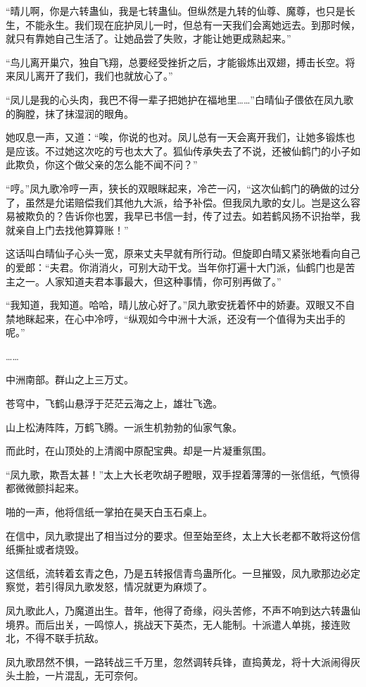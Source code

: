 \begin{this_body}
“晴儿啊，你是六转蛊仙，我是七转蛊仙。但纵然是九转的仙尊、魔尊，也只是长生，不能永生。我们现在庇护凤儿一时，但总有一天我们会离她远去。到那时候，就只有靠她自己生活了。让她品尝了失败，才能让她更成熟起来。”

“鸟儿离开巢穴，独自飞翔，总要经受挫折之后，才能锻炼出双翅，搏击长空。将来凤儿离开了我们，我们也就放心了。”

“凤儿是我的心头肉，我巴不得一辈子把她护在福地里……”白晴仙子偎依在凤九歌的胸膛，抹了抹湿润的眼角。

她叹息一声，又道：“唉，你说的也对。凤儿总有一天会离开我们，让她多锻炼也是应该。不过她这次吃的亏也太大了。狐仙传承失去了不说，还被仙鹤门的小子如此欺负，你这个做父亲的怎么能不闻不问？”

“哼。”凤九歌冷哼一声，狭长的双眼眯起来，冷芒一闪，“这次仙鹤门的确做的过分了，虽然是允诺赔偿我们其他九大派，给予补偿。但我凤九歌的女儿。岂是这么容易被欺负的？告诉你也罢，我早已书信一封，传了过去。如若鹤风扬不识抬举，我就亲自上门去找他算算账！”

这话叫白晴仙子心头一宽，原来丈夫早就有所行动。但旋即白晴又紧张地看向自己的爱郎：“夫君。你消消火，可别大动干戈。当年你打遍十大门派，仙鹤门也是苦主之一。人家知道夫君本事最大，但这种事情，你可别再做了。”

“我知道，我知道。哈哈，晴儿放心好了。”凤九歌安抚着怀中的娇妻。双眼又不自禁地眯起来，在心中冷哼，“纵观如今中洲十大派，还没有一个值得为夫出手的呢。”

……

中洲南部。群山之上三万丈。

苍穹中，飞鹤山悬浮于茫茫云海之上，雄壮飞逸。

山上松涛阵阵，万鹤飞腾。一派生机勃勃的仙家气象。

而此时，在山顶处的上清阁中原配宝典。却是一片凝重氛围。

“凤九歌，欺吾太甚！”太上大长老吹胡子瞪眼，双手捏着薄薄的一张信纸，气愤得都微微颤抖起来。

啪的一声，他将信纸一掌拍在昊天白玉石桌上。

在信中，凤九歌提出了相当过分的要求。但至始至终，太上大长老都不敢将这份信纸撕扯或者烧毁。

这信纸，流转着玄青之色，乃是五转报信青鸟蛊所化。一旦摧毁，凤九歌那边必定察觉，若引得凤九歌发怒，情况就更为麻烦了。

凤九歌此人，乃魔道出生。昔年，他得了奇缘，闷头苦修，不声不响到达六转蛊仙境界。而后出关，一鸣惊人，挑战天下英杰，无人能制。十派遣人单挑，接连败北，不得不联手抗敌。

凤九歌昂然不惧，一路转战三千万里，忽然调转兵锋，直捣黄龙，将十大派闹得灰头土脸，一片混乱，无可奈何。


\end{this_body}

